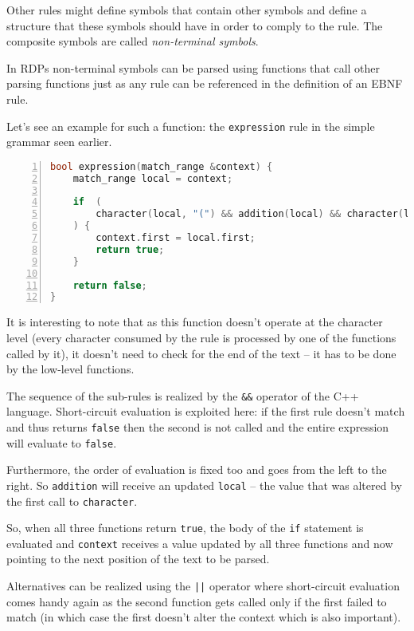 \documentclass[12pt]{article}
\begin{document}
Other rules might define symbols that contain other symbols and define a structure that these symbols should
have in order to comply to the rule. The composite symbols are called \emph{non-terminal symbols}.

In RDPs non-terminal symbols can be parsed using functions that call other parsing functions just as any rule
can be referenced in the definition of an EBNF rule.

Let's see an example for such a function: the \texttt{expression} rule in the simple grammar seen earlier.

\begin{center}
	\begin{minipage}[h]{0.8\textwidth}
		\begin{lstlisting}[language=C++, breaklines=true, numbers=left]
bool expression(match_range &context) {
	match_range local = context;

	if  (
		character(local, "(") && addition(local) && character(local, ")")
	) {
		context.first = local.first;
		return true;
	}

	return false;
}
		\end{lstlisting}
	\end{minipage}
\end{center}

It is interesting to note that as this function doesn't operate at the character level (every character
consumed by the rule is processed by one of the functions called by it), it doesn't need to check for the end
of the text -- it has to be done by the low-level functions.

The sequence of the sub-rules is realized by the \texttt{\&\&} operator of the C++ language. Short-circuit
evaluation is exploited here: if the first rule doesn't match and thus returns \texttt{false} then the second
is not called and the entire expression will evaluate to \texttt{false}.

Furthermore, the order of evaluation is fixed too and goes from the left to the right. So \texttt{addition}
will receive an updated \texttt{local} -- the value that was altered by the first call to \texttt{character}.

So, when all three functions return \texttt{true}, the body of the \texttt{if} statement is evaluated and
\texttt{context} receives a value updated by all three functions and now pointing to the next position of the
text to be parsed.

Alternatives can be realized using the \texttt{||} operator where short-circuit evaluation comes handy again
as the second function gets called only if the first failed to match (in which case the first doesn't alter
the context which is also important).
\end{document}
